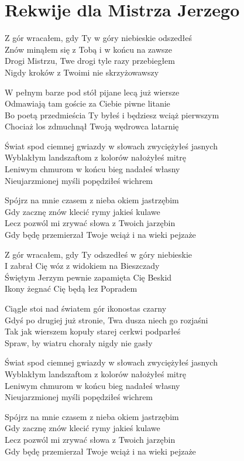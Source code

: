 \section{Rekwije dla Mistrza Jerzego}
\begin{text}
\footnotesize{Z gór wracałem, gdy Ty w góry niebieskie odszedłeś\\
Znów minąłem się z Tobą i w końcu na zawsze\\
Drogi Mistrzu, Twe drogi tyle razy przebiegłem\\
Nigdy kroków z Twoimi nie skrzyżowawszy

W pełnym barze pod stół pijane lecą już wiersze\\
Odmawiają tam goście za Ciebie piwne litanie\\
Bo poetą przedmieścia Ty byłeś i będziesz wciąż pierwszym\\
Chociaż los zdmuchnął Twoją wędrowca latarnię

Świat spod ciemnej gwiazdy w słowach zwyciężyłeś jasnych\\
Wyblakłym landszaftom z kolorów nałożyłeś mitrę\\
Leniwym chmurom w końcu bieg nadałeś własny\\
Nieujarzmionej myśli popędziłeś wichrem

Spójrz na mnie czasem z nieba okiem jastrzębim\\
Gdy zacznę znów klecić rymy jakieś kulawe\\
Lecz pozwól mi zrywać słowa z Twoich jarzębin\\
Gdy będę przemierzał Twoje wciąż i na wieki pejzaże

Z gór wracałem, gdy Ty odszedłeś w góry niebieskie\\
I zabrał Cię wóz z widokiem na Bieszczady\\
Świętym Jerzym pewnie zapamięta Cię Beskid\\
Ikony żegnać Cię będą łez Popradem

Ciągle stoi nad światem gór ikonostas czarny\\
Gdyś po drugiej już stronie, Twa dusza niech go rozjaśni\\
Tak jak wierszem kopuły starej cerkwi podparłeś\\
Spraw, by wiatru chorały nigdy nie gasły

Świat spod ciemnej gwiazdy w słowach zwyciężyłeś jasnych\\
Wyblakłym landszaftom z kolorów nałożyłeś mitrę\\
Leniwym chmurom w końcu bieg nadałeś własny\\
Nieujarzmionej myśli popędziłeś wichrem

Spójrz na mnie czasem z nieba okiem jastrzębim\\
Gdy zacznę znów klecić rymy jakieś kulawe\\
Lecz pozwól mi zrywać słowa z Twoich jarzębin\\
Gdy będę przemierzał Twoje wciąż i na wieki pejzaże}
\end{text}
